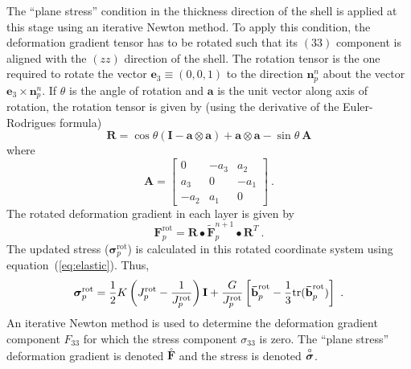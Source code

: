       The ``plane stress'' condition in the thickness direction of the shell
      is applied at this stage using an iterative Newton method.  To apply
      this condition, the deformation gradient tensor has to be rotated such 
      that its $(33)$ component is aligned with the $(zz)$ direction of the 
      shell.  The rotation tensor is the one required to rotate
      the vector $\mathbf{e}_3 \equiv (0,0,1)$ to the direction 
      $\mathbf{n}_p^n$ about the vector $\mathbf{e}_3 \times \mathbf{n}_p^n$.
      If $\theta$ is the angle of rotation and $\mathbf{a}$ is the unit vector
      along axis of rotation, the rotation tensor is given by (using the 
      derivative of the Euler-Rodrigues formula)
      \begin{equation}
        \mathbf{R} = \cos\theta\left(\mathbf{I}-
           \mathbf{a}\otimes\mathbf{a}\right) + \mathbf{a}\otimes\mathbf{a} -
           \sin\theta~\mathbf{A}
         \label{eq:rotation}
      \end{equation}
      where 
      \begin{equation}
        \mathbf{A} = \begin{bmatrix} 0 & -a_3 & a_2 \\ a_3 & 0 & -a_1 \\
                       -a_2 & a_1 & 0 \end{bmatrix}~.
      \end{equation}
      The rotated deformation gradient in each layer is given by
      \begin{equation}
        \mathbf{F}_p^{\text{rot}} = \mathbf{R}\bullet
          \boldsymbol{\tilde{\mathbf{F}}}_p^{n+1}
          \bullet\mathbf{R}^T~.
      \end{equation}
      The updated stress ($\boldsymbol{\sigma}_p^{\text{rot}}$) is calculated 
      in this rotated coordinate system using
      equation~(\ref{eq:elastic}).  Thus, 
      \begin{equation}
        \boldsymbol{\sigma}_p^{\text{rot}} = 
           \frac{1}{2}K\left(J_p^{\text{rot}}-\frac{1}{J_p^{\text{rot}}}\right)
           \mathbf{I} +
           \frac{G}{J_p^{\text{rot}}}\left[
             \boldsymbol{\Bar{\mathbf{b}}}_p^{\text{rot}} - 
             \frac{1}{3}\text{tr}(
             \boldsymbol{\Bar{\mathbf{b}}}_p^{\text{rot}})\right]~.
      \end{equation}
      An iterative Newton method is used to
      determine the deformation gradient component $F_{33}$ for
      which the stress component $\sigma_{33}$ is zero.  The 
      ``plane stress'' deformation gradient is denoted 
      $\overset{\circ}{\mathbf{F}}$ and the stress is denoted
      $\overset{\circ}{\boldsymbol{\sigma}}$.  

